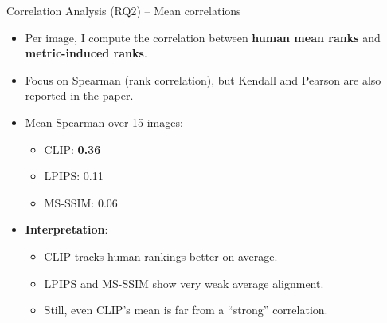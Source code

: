 \documentclass[aspectratio=169]{beamer}
\begin{document}
\begin{frame}{Correlation Analysis (RQ2) – Mean correlations}
  \small
  \begin{itemize}
    \item Per image, I compute the correlation between
          \textbf{human mean ranks} and \textbf{metric-induced ranks}.
    \item Focus on Spearman (rank correlation), but Kendall and
          Pearson are also reported in the paper.
    \item Mean Spearman over 15 images:
      \begin{itemize}
        \item CLIP: \textbf{0.36}
        \item LPIPS: 0.11
        \item MS-SSIM: 0.06
      \end{itemize}
    \item \textbf{Interpretation}:
      \begin{itemize}
        \item CLIP tracks human rankings better on average.
        \item LPIPS and MS-SSIM show very weak average alignment.
        \item Still, even CLIP’s mean is far from a “strong”
              correlation.
      \end{itemize}
  \end{itemize}
\end{frame}
\end{document}
